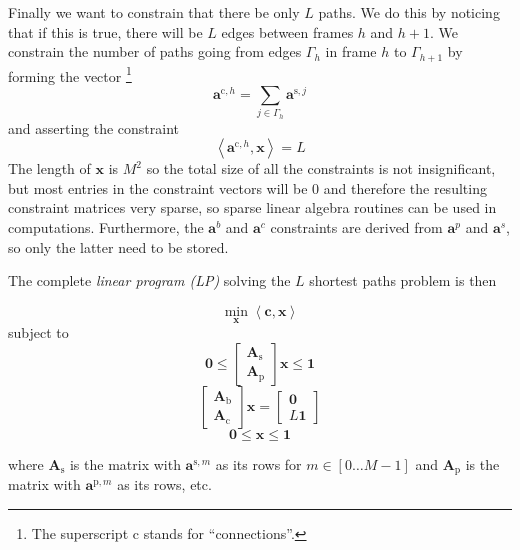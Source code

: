 Finally we want to constrain that there be only $L$ paths. We do this by
noticing that if this is true, there will be $L$ edges between frames $h$ and
$h+1$. We constrain the number of paths going from edges
$\Gamma_{h}$ in frame $h$ to $\Gamma_{h+1}$ by forming the vector
\footnote{The superscript c stands for ``connections''.}
\[
    \boldsymbol{a}^{\text{c},h} = \sum_{j \in \Gamma_{h}}
    \boldsymbol{a}^{\text{s},j}
\]
and asserting the constraint
\[
    \left\langle \boldsymbol{a}^{\text{c},h} , \boldsymbol{x} \right\rangle = L
\]
The length of $\boldsymbol{x}$ is $M^{2}$ so the total size of all the
constraints is not insignificant, but most entries in the constraint vectors will
be 0 and therefore the resulting constraint matrices very sparse, so sparse
linear algebra routines can be used in computations. Furthermore, the
$\boldsymbol{a}^{b}$ and $\boldsymbol{a}^{c}$ constraints are derived from
$\boldsymbol{a}^{p}$ and $\boldsymbol{a}^{s}$, so only the latter need to be
stored.

The complete \textit{linear program (LP)} solving the $L$ shortest paths problem is then
\begin{samepage}
\[
    \min_{\boldsymbol{x}} \left\langle \boldsymbol{c}, \boldsymbol{x} \right\rangle
\]
subject to
\[
    \boldsymbol{0} \leq
    \begin{bmatrix}
        \boldsymbol{A}_{\text{s}} \\
        \boldsymbol{A}_{\text{p}}
    \end{bmatrix} \boldsymbol{x}
    \leq \boldsymbol{1}
\]
\[
    \begin{bmatrix}
        \boldsymbol{A}_{\text{b}} \\
        \boldsymbol{A}_{\text{c}}
    \end{bmatrix}
    \boldsymbol{x}
    =
    \begin{bmatrix}
        \boldsymbol{0} \\
        L\boldsymbol{1}
    \end{bmatrix}
\]
\[
    \boldsymbol{0} \leq \boldsymbol{x} \leq \boldsymbol{1}
\]
\end{samepage}
where $\boldsymbol{A}_{\text{s}}$ is the matrix with
$\boldsymbol{a}^{\text{s},m}$ as its rows for $m \in [0 \dotsc M-1]$ and
$\boldsymbol{A}_{\text{p}}$ is the matrix with $\boldsymbol{a}^{\text{p},m}$ as
its rows, etc.


